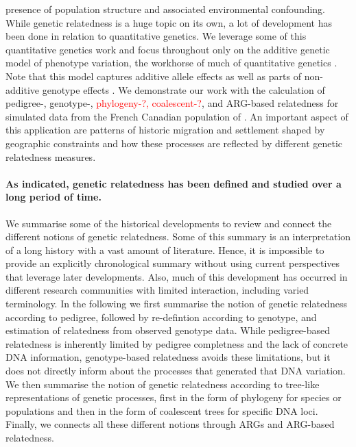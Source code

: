 presence of population structure and associated environmental confounding.
%
While genetic relatedness is a huge topic on its own, a lot of development
has been done in relation to quantitative genetics.
%
We leverage some of this quantitative genetics work and focus throughout
only on the additive genetic model of phenotype variation, the workhorse
of much of quantitative genetics
\citep{falconer1996introduction, lynch1998genetics}.
%
Note that this model captures additive allele effects as well as
parts of non-additive genotype effects
\cite[e.g.][]{hill2008data, hivert2021gene}.
%
We demonstrate our work with the calculation of pedigree-, genotype-,
\textcolor{red}{phylogeny-?, coalescent-?}, and ARG-based relatedness 
for simulated data from the French Canadian population of
\cite{andersontrocme2023genes}.
%
An important aspect of this application are patterns of historic migration
and settlement shaped by geographic constraints and how these processes are
reflected by different genetic relatedness measures.

\paragraph{As indicated, genetic relatedness has been defined
and studied over a long period of time.}
%
We summarise some of the historical developments to review and connect
the different notions of genetic relatedness.
%
Some of this summary is an interpretation of a long history
with a vast amount of literature.
%
Hence, it is impossible to provide an explicitly chronological summary
without using current perspectives that leverage later developments.
%
Also, much of this development has occurred in different research communities
with limited interaction, including varied terminology.
%
In the following we first summarise the notion of genetic relatedness
according to pedigree, followed by re-defintion according to genotype, and
estimation of relatedness from observed genotype data.
%
While pedigree-based relatedness is inherently limited by pedigree
completness and the lack of concrete DNA information, genotype-based
relatedness avoids these limitations, but it does not directly inform
about the processes that generated that DNA variation.
%
We then summarise the notion of genetic relatedness according
to tree-like representations of genetic processes, first in the form of
phylogeny for species or populations and then in the form of coalescent
trees for specific DNA loci.
%
Finally, we connects all these different notions through ARGs and ARG-based
relatedness.


